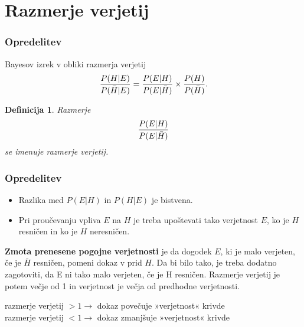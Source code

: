 \documentclass{beamer}
\newtheorem{definicija}{Definicija}
\begin{document}
\section{Razmerje verjetij}

\begin{frame}
   \frametitle{Opredelitev}
   Bayesov izrek v obliki razmerja verjetij
   \[
   \frac{P(H \lvert E)}{P(\bar{H} \lvert E)} = \frac{P(E \lvert H)}{P(E \lvert \bar{H})} \times \frac{P(H)}{P(\bar{H})}. \vspace{2mm}
   \]
   \begin{definicija} 
      Razmerje
      \[
          \frac{P(E \lvert H)}{P(E \lvert \bar{H})} \vspace{2mm}
      \]
       se imenuje razmerje verjetij. 
  \end{definicija}
\end{frame}

\begin{frame}
   \frametitle{Opredelitev}
   \begin{itemize}
      \item Razlika med $P(E \lvert H)$ in $P(H \lvert E)$ je bistvena.
      \item Pri proučevanju vpliva $E$ na $H$ je treba upoštevati tako verjetnost $E$, ko je $H$ resničen in ko je $H$ neresničen.
   \end{itemize}
   \begin{block}{\textbf{Zmota prenesene pogojne verjetnosti}}
      je da dogodek $E$, ki je malo verjeten, če je $\bar{H}$ resničen, pomeni dokaz v prid $H$. Da bi bilo tako, je treba dodatno
      zagotoviti, da E ni tako malo verjeten, če je H resničen. Razmerje verjetij je potem večje od 1 in verjetnost je večja od
      predhodne verjetnosti.
   \end{block}\vspace{2mm}
   razmerje verjetij $> 1 \rightarrow$  dokaz povečuje »verjetnost« krivde\\
   razmerje verjetij $< 1 \rightarrow$  dokaz zmanjšuje »verjetnost« krivde\\
\end{frame}
\end{document}
